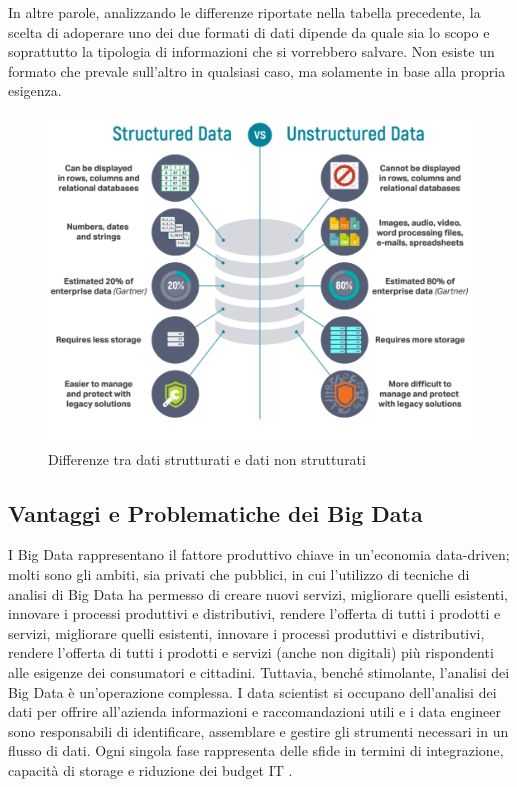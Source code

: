 In altre parole, analizzando le differenze riportate nella tabella precedente, la scelta di adoperare uno dei due formati di dati dipende da quale sia lo scopo e soprattutto la tipologia di informazioni che si vorrebbero salvare. Non esiste un formato che prevale sull'altro in qualsiasi caso, ma solamente in base alla propria esigenza.

\begin{figure}[h!]
    \centering
    \includegraphics[width=0.55\linewidth]{figure/capitolo_2/structured-data-vs-unstructured-data.pdf}
    \caption{Differenze tra dati strutturati e dati non strutturati}
    \label{fig:structured-data-vs-unstructured-data}
\end{figure}

\subsection{Vantaggi e Problematiche dei Big Data}

I Big Data rappresentano il fattore produttivo chiave in un'economia data-driven; molti sono gli ambiti, sia privati che pubblici, in cui l'utilizzo di tecniche di analisi di Big Data ha permesso di creare nuovi servizi, migliorare quelli esistenti, innovare i processi produttivi e distributivi, rendere l'offerta di tutti i prodotti e servizi, migliorare quelli esistenti, innovare i processi produttivi e distributivi, rendere l'offerta di tutti i prodotti e servizi (anche non digitali) più rispondenti alle esigenze dei consumatori e cittadini. Tuttavia, benché stimolante, l'analisi dei Big Data è un'operazione complessa. I data scientist si occupano dell'analisi dei dati per offrire all'azienda informazioni e raccomandazioni utili e i data engineer sono responsabili di identificare, assemblare e gestire gli strumenti necessari in un flusso di dati. Ogni singola fase rappresenta delle sfide in termini di integrazione, capacità di storage e riduzione dei budget IT \cite{redhat_big_data}.

